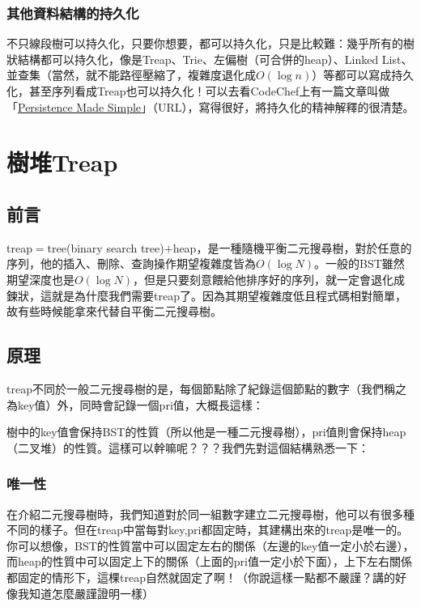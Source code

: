 		\subsection{其他資料結構的持久化}
			不只線段樹可以持久化，只要你想要，都可以持久化，只是比較難：幾乎所有的樹狀結構都可以持久化，像是Treap、Trie、左偏樹（可合併的heap）、Linked List、並查集（當然，就不能路徑壓縮了，複雜度退化成$O(\log n)$）等都可以寫成持久化，甚至序列看成Treap也可以持久化！可以去看CodeChef上有一篇文章叫做「\href{https://discuss.codechef.com/t/persistence-made-simple-tutorial/14915}{\underline{Persistence Made Simple}}」（URL），寫得很好，將持久化的精神解釋的很清楚。

\chapter{樹堆Treap}
\section{前言}
treap$=$tree(binary search tree)$+$heap，是一種隨機平衡二元搜尋樹，對於任意的序列，他的插入、刪除、查詢操作期望複雜度皆為$O(\log N)$。一般的BST雖然期望深度也是$O(\log N)$，但是只要刻意餵給他排序好的序列，就一定會退化成鍊狀，這就是為什麼我們需要treap了。因為其期望複雜度低且程式碼相對簡單，故有些時候能拿來代替自平衡二元搜尋樹。
\section{原理}
treap不同於一般二元搜尋樹的是，每個節點除了紀錄這個節點的數字（我們稱之為key值）外，同時會記錄一個pri值，大概長這樣：
樹中的key值會保持BST的性質（所以他是一種二元搜尋樹），pri值則會保持heap（二叉堆）的性質。這樣可以幹嘛呢？？？我們先對這個結構熟悉一下：
\subsection{唯一性}
在介紹二元搜尋樹時，我們知道對於同一組數字建立二元搜尋樹，他可以有很多種不同的樣子。但在treap中當每對key,pri都固定時，其建構出來的treap是唯一的。你可以想像，BST的性質當中可以固定左右的關係（左邊的key值一定小於右邊），而heap的性質中可以固定上下的關係（上面的pri值一定小於下面），上下左右關係都固定的情形下，這棵treap自然就固定了啊！（你說這樣一點都不嚴謹？講的好像我知道怎麼嚴謹證明一樣）
